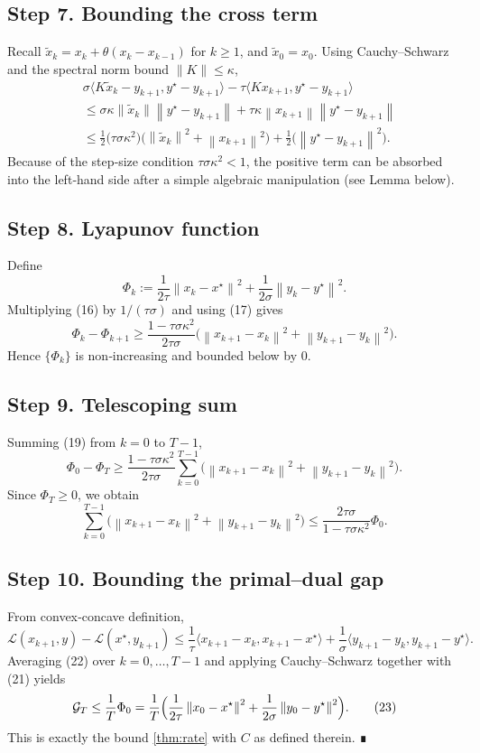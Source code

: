 \documentclass[11pt]{article}
\newcommand{\ip}[2]{\langle #1,#2\rangle}
\newcommand{\norm}[1]{\left\|#1\right\|}
\begin{document}
\subsection*{Step 7.  Bounding the cross term}
Recall $\tilde x_k = x_k+\theta(x_k-x_{k-1})$ for $k\ge1$, and $\tilde x_0=x_0$.  
Using Cauchy–Schwarz and the spectral norm bound $\|K\|\le\kappa$,
\[
\begin{aligned}
&\sigma\ip{K\tilde x_k-y_{k+1}}{y^{\star}-y_{k+1}}
   -\tau\langle Kx_{k+1},y^{\star}-y_{k+1}\rangle\\
&\le \sigma\kappa\norm{\tilde x_k}\norm{y^{\star}-y_{k+1}}
      +\tau\kappa\norm{x_{k+1}}\norm{y^{\star}-y_{k+1}}\\
&\le \frac{1}{2}\bigl(\tau\sigma\kappa^{2}\bigr)
      \bigl(\norm{\tilde x_k}^{2}+\norm{x_{k+1}}^{2}\bigr)
      +\frac12\bigl(\norm{y^{\star}-y_{k+1}}^{2}\bigr).
\end{aligned}
\tag{17}
\]
Because of the step‑size condition $\tau\sigma\kappa^{2}<1$, the positive term can be absorbed into the left‑hand side after a simple algebraic manipulation (see Lemma below).

\subsection*{Step 8.  Lyapunov function}
Define
\[
\Phi_k:=\frac{1}{2\tau}\norm{x_k-x^{\star}}^{2}
       +\frac{1}{2\sigma}\norm{y_k-y^{\star}}^{2}.
\tag{18}
\]
Multiplying (16) by $1/(\tau\sigma)$ and using (17) gives
\[
\Phi_k-\Phi_{k+1}
   \ge \frac{1-\tau\sigma\kappa^{2}}{2\tau\sigma}
        \bigl(\norm{x_{k+1}-x_k}^{2}+\norm{y_{k+1}-y_k}^{2}\bigr).
\tag{19}
\]
Hence $\{\Phi_k\}$ is non‑increasing and bounded below by $0$.

\subsection*{Step 9.  Telescoping sum}
Summing (19) from $k=0$ to $T-1$,
\[
\Phi_0-\Phi_T
   \ge \frac{1-\tau\sigma\kappa^{2}}{2\tau\sigma}
        \sum_{k=0}^{T-1}\bigl(\norm{x_{k+1}-x_k}^{2}
                               +\norm{y_{k+1}-y_k}^{2}\bigr).
\tag{20}
\]
Since $\Phi_T\ge0$, we obtain
\[
\sum_{k=0}^{T-1}\bigl(\norm{x_{k+1}-x_k}^{2}
                     +\norm{y_{k+1}-y_k}^{2}\bigr)
   \le \frac{2\tau\sigma}{1-\tau\sigma\kappa^{2}}\Phi_0.
\tag{21}
\]

\subsection*{Step 10.  Bounding the primal–dual gap}
From convex‑concave definition,
\[
\mathcal{L}(x_{k+1},y)-\mathcal{L}(x^{\star},y_{k+1})
   \le \frac{1}{\tau}\ip{x_{k+1}-x_k}{x_{k+1}-x^{\star}}
      +\frac{1}{\sigma}\ip{y_{k+1}-y_k}{y_{k+1}-y^{\star}}.
\tag{22}
\]
Averaging (22) over $k=0,\dots,T-1$ and applying Cauchy–Schwarz together with (21) yields
\[
\mathcal{G}_T\le\frac{1}{T}\Phi_0
   =\frac{1}{T}\Bigl(\frac{1}{2\tau}\norm{x_0-x^{\star}}^{2}
                    +\frac{1}{2\sigma}\norm{y_0-y^{\star}}^{2}\Bigr).
\tag{23}
\]
This is exactly the bound \eqref{thm:rate} with $C$ as defined therein. ∎
\end{document}
